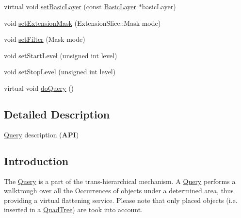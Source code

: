 \begin{DoxyCompactItemize}
\item 
virtual void \mbox{\hyperlink{classHurricane_1_1Query_ac3718c4e2cd4d5e80af32558285481af}{set\+Basic\+Layer}} (const \mbox{\hyperlink{classHurricane_1_1BasicLayer}{Basic\+Layer}} $\ast$basic\+Layer)
\item 
void \mbox{\hyperlink{classHurricane_1_1Query_af7f83fd3aefe1b5654f9bdd3566fe0d4}{set\+Extension\+Mask}} (Extension\+Slice\+::\+Mask mode)
\item 
void \mbox{\hyperlink{classHurricane_1_1Query_a457a0cda5ea5ad849a46aefce2514963}{set\+Filter}} (Mask mode)
\item 
void \mbox{\hyperlink{classHurricane_1_1Query_a8c4bc1bcfae942042ccb90a46b6fb510}{set\+Start\+Level}} (unsigned int level)
\item 
void \mbox{\hyperlink{classHurricane_1_1Query_a70359c71d7dc7e3f17d0a29c8208c92f}{set\+Stop\+Level}} (unsigned int level)
\item 
virtual void \mbox{\hyperlink{classHurricane_1_1Query_a2ca5bf71c7b35e14c4a64488a5e21bc6}{do\+Query}} ()
\end{DoxyCompactItemize}


\subsection{Detailed Description}
\mbox{\hyperlink{classHurricane_1_1Query}{Query}} description ({\bfseries A\+PI}) 

\hypertarget{classHurricane_1_1Query_secQueryIntro}{}\subsection{Introduction}\label{classHurricane_1_1Query_secQueryIntro}
The \mbox{\hyperlink{classHurricane_1_1Query}{Query}} is a part of the trans-\/hierarchical mechanism. A \mbox{\hyperlink{classHurricane_1_1Query}{Query}} performs a walktrough over all the Occurrences of objects under a determined area, thus providing a virtual flattening service. Please note that only placed objects (i.\+e. inserted in a \mbox{\hyperlink{classHurricane_1_1QuadTree}{Quad\+Tree}}) are took into account.

